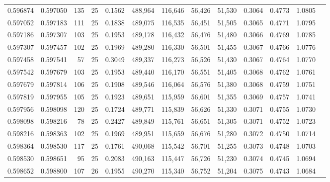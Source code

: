 \begin{tabular}{rrrrrrrrrrrrr}
0.596874 & 0.597050 &   135 &  25 &                                     0.1562 & 488,964 & 116,646 &  56,426 &  51,530 & 0.3064 & 0.4773 & 1.0805 \\
0.597052 & 0.597183 &   111 &  25 &                                     0.1838 & 489,075 & 116,535 &  56,451 &  51,505 & 0.3065 & 0.4771 & 1.0795 \\
0.597186 & 0.597307 &   103 &  25 &                                     0.1953 & 489,178 & 116,432 &  56,476 &  51,480 & 0.3066 & 0.4769 & 1.0785 \\
0.597307 & 0.597457 &   102 &  25 &                                     0.1969 & 489,280 & 116,330 &  56,501 &  51,455 & 0.3067 & 0.4766 & 1.0776 \\
0.597458 & 0.597541 &    57 &  25 &                                     0.3049 & 489,337 & 116,273 &  56,526 &  51,430 & 0.3067 & 0.4764 & 1.0770 \\
0.597542 & 0.597679 &   103 &  25 &                                     0.1953 & 489,440 & 116,170 &  56,551 &  51,405 & 0.3068 & 0.4762 & 1.0761 \\
0.597679 & 0.597814 &   106 &  25 &                                     0.1908 & 489,546 & 116,064 &  56,576 &  51,380 & 0.3068 & 0.4759 & 1.0751 \\
0.597819 & 0.597955 &   105 &  25 &                                     0.1923 & 489,651 & 115,959 &  56,601 &  51,355 & 0.3069 & 0.4757 & 1.0741 \\
0.597956 & 0.598098 &   120 &  25 &                                     0.1724 & 489,771 & 115,839 &  56,626 &  51,330 & 0.3071 & 0.4755 & 1.0730 \\
0.598098 & 0.598216 &    78 &  25 &                                     0.2427 & 489,849 & 115,761 &  56,651 &  51,305 & 0.3071 & 0.4752 & 1.0723 \\
0.598216 & 0.598363 &   102 &  25 &                                     0.1969 & 489,951 & 115,659 &  56,676 &  51,280 & 0.3072 & 0.4750 & 1.0714 \\
0.598364 & 0.598530 &   117 &  25 &                                     0.1761 & 490,068 & 115,542 &  56,701 &  51,255 & 0.3073 & 0.4748 & 1.0703 \\
0.598530 & 0.598651 &    95 &  25 &                                     0.2083 & 490,163 & 115,447 &  56,726 &  51,230 & 0.3074 & 0.4745 & 1.0694 \\
0.598652 & 0.598800 &   107 &  26 &                                     0.1955 & 490,270 & 115,340 &  56,752 &  51,204 & 0.3075 & 0.4743 & 1.0684 \\

\end{tabular}
